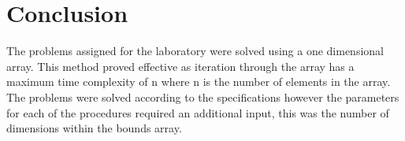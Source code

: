 \documentclass{TechReport}
\begin{document}
\section{Conclusion}
The problems assigned for the laboratory were solved using a one dimensional array. This method proved effective as iteration through the array has a maximum time complexity of n where n is the number of elements in the array. The problems were solved according to the specifications however the parameters for each of the procedures required an additional input, this was the number of dimensions within the bounds array.  
\end{document}
